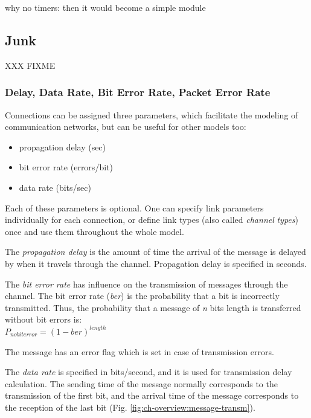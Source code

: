 why no timers: then it would become a simple module


\subsection{Junk}  XXX FIXME


\subsubsection{Delay, Data Rate, Bit Error Rate, Packet Error Rate}


Connections can be assigned three parameters, which facilitate
the modeling of communication networks, but can be useful for
other models too:
\begin{itemize}
  \item{propagation delay (sec)}
  \item{bit error rate (errors/bit)}
  \item{data rate (bits/sec)}
\end{itemize}


Each of these parameters is optional. One can specify link parameters
individually for each connection, or define link types (also
called \textit{channel} \textit{types}) once and use them throughout the
whole model.

The \textit{propagation delay} is the amount of time the arrival of
the message is delayed by when it travels through the channel.
Propagation delay is specified in seconds.

The \textit{bit error rate} has influence on the transmission of messages
through the channel. The bit error rate (\textit{ber}) is the probability that
a bit is incorrectly transmitted. Thus, the probability that
a message of \textit{n} bits length is transferred without bit errors is:\\

$P_{no bit error} = (1 - {ber})^{length}$

The message has an error flag which is set in case of transmission
errors.

The \textit{data rate} is specified in bits/second, and it is used
for transmission delay calculation. The sending time of the message
normally corresponds to the transmission of the first bit, and
the arrival time of the message corresponds to the reception
of the last bit (Fig. \ref{fig:ch-overview:message-transm}).

